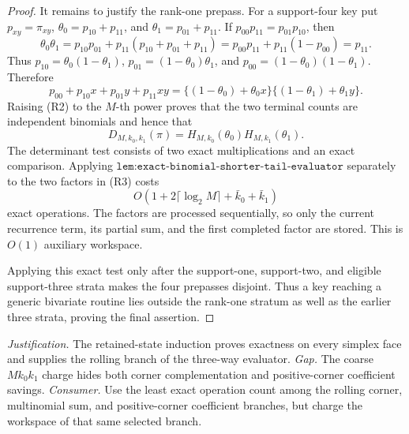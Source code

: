 \documentclass{article}
\begin{document}
\begin{proof}
It remains to justify the rank-one prepass. For a support-four key put \(p_{xy}=\pi_{xy}\), \(\theta_0=p_{10}+p_{11}\), and \(\theta_1=p_{01}+p_{11}\). If \(p_{00}p_{11}=p_{01}p_{10}\), then
\[
\theta_0\theta_1
=p_{10}p_{01}+p_{11}(p_{10}+p_{01}+p_{11})
=p_{00}p_{11}+p_{11}(1-p_{00})=p_{11}.
\tag{R1}
\]
Thus \(p_{10}=\theta_0(1-\theta_1)\), \(p_{01}=(1-\theta_0)\theta_1\), and \(p_{00}=(1-\theta_0)(1-\theta_1)\). Therefore
\[
p_{00}+p_{10}x+p_{01}y+p_{11}xy
=\{(1-\theta_0)+\theta_0x\}\{(1-\theta_1)+\theta_1y\}.
\tag{R2}
\]
Raising (R2) to the \(M\)-th power proves that the two terminal counts are independent binomials and hence that
\[
D_{M,k_0,k_1}(\pi)=H_{M,k_0}(\theta_0)H_{M,k_1}(\theta_1).
\tag{R3}
\]
The determinant test consists of two exact multiplications and an exact comparison. Applying \(\texttt{lem:exact-binomial-shorter-tail-evaluator}\) separately to the two factors in (R3) costs
\[
O\!\left(1+2\lceil\log_2M\rceil+\bar k_0+\bar k_1\right)
\]
exact operations. The factors are processed sequentially, so only the current recurrence term, its partial sum, and the first completed factor are stored. This is \(O(1)\) auxiliary workspace.

Applying this exact test only after the support-one, support-two, and eligible support-three strata makes the four prepasses disjoint. Thus a key reaching a generic bivariate routine lies outside the rank-one stratum as well as the earlier three strata, proving the final assertion.
\end{proof}
\par\smallskip\noindent \textit{Justification.} The retained-state induction proves exactness on every simplex face and supplies the rolling branch of the three-way evaluator. \textit{Gap.} The coarse \(Mk_0k_1\) charge hides both corner complementation and positive-corner coefficient savings. \textit{Consumer.} Use the least exact operation count among the rolling corner, multinomial sum, and positive-corner coefficient branches, but charge the workspace of that same selected branch.
\end{document}
